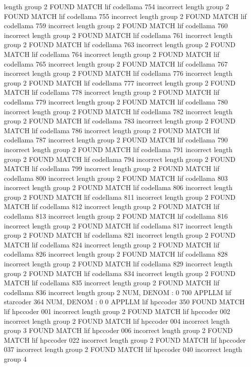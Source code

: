 length group  2
FOUND MATCH lif codellama 754 incorrect
length group  2
FOUND MATCH lif codellama 755 incorrect
length group  2
FOUND MATCH lif codellama 759 incorrect
length group  2
FOUND MATCH lif codellama 760 incorrect
length group  2
FOUND MATCH lif codellama 761 incorrect
length group  2
FOUND MATCH lif codellama 763 incorrect
length group  2
FOUND MATCH lif codellama 764 incorrect
length group  2
FOUND MATCH lif codellama 765 incorrect
length group  2
FOUND MATCH lif codellama 767 incorrect
length group  2
FOUND MATCH lif codellama 776 incorrect
length group  2
FOUND MATCH lif codellama 777 incorrect
length group  2
FOUND MATCH lif codellama 778 incorrect
length group  2
FOUND MATCH lif codellama 779 incorrect
length group  2
FOUND MATCH lif codellama 780 incorrect
length group  2
FOUND MATCH lif codellama 782 incorrect
length group  2
FOUND MATCH lif codellama 783 incorrect
length group  2
FOUND MATCH lif codellama 786 incorrect
length group  2
FOUND MATCH lif codellama 787 incorrect
length group  2
FOUND MATCH lif codellama 790 incorrect
length group  2
FOUND MATCH lif codellama 791 incorrect
length group  2
FOUND MATCH lif codellama 794 incorrect
length group  2
FOUND MATCH lif codellama 799 incorrect
length group  2
FOUND MATCH lif codellama 800 incorrect
length group  2
FOUND MATCH lif codellama 803 incorrect
length group  2
FOUND MATCH lif codellama 806 incorrect
length group  2
FOUND MATCH lif codellama 811 incorrect
length group  2
FOUND MATCH lif codellama 812 incorrect
length group  2
FOUND MATCH lif codellama 813 incorrect
length group  2
FOUND MATCH lif codellama 816 incorrect
length group  2
FOUND MATCH lif codellama 817 incorrect
length group  2
FOUND MATCH lif codellama 821 incorrect
length group  2
FOUND MATCH lif codellama 824 incorrect
length group  2
FOUND MATCH lif codellama 826 incorrect
length group  2
FOUND MATCH lif codellama 828 incorrect
length group  2
FOUND MATCH lif codellama 829 incorrect
length group  2
FOUND MATCH lif codellama 834 incorrect
length group  2
FOUND MATCH lif codellama 835 incorrect
length group  2
FOUND MATCH lif codellama 836 incorrect
length group  2
NUM, DENOM : 0 700
APPLLM lif starcoder
364
NUM, DENOM : 0 0
APPLLM lif hpccoder
350
FOUND MATCH lif hpccoder 001 incorrect
length group  2
FOUND MATCH lif hpccoder 002 incorrect
length group  2
FOUND MATCH lif hpccoder 004 incorrect
length group  3
FOUND MATCH lif hpccoder 006 incorrect
length group  2
FOUND MATCH lif hpccoder 022 incorrect
length group  2
FOUND MATCH lif hpccoder 037 incorrect
length group  2
FOUND MATCH lif hpccoder 040 incorrect
length group  4
